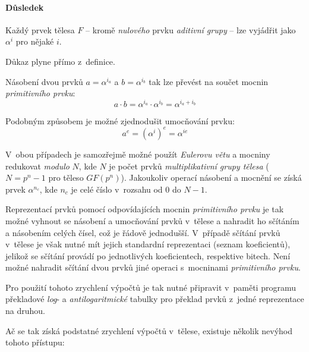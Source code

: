 \documentclass[thesis=M,czech,hidelinks]{FITthesis}[2012/06/26]
\newcommand{\0}{{\textcolor[gray]{0.80}{0}}}
\begin{document}
\paragraph{Důsledek} Každý prvek tělesa $F$ -- kromě \emph{nulového} prvku
\emph{aditivní grupy} -- lze vyjádřit jako $\alpha^i$ pro nějaké $i$.

Důkaz plyne přímo z~definice.

Násobení dvou prvků $a = \alpha^{i_a}$ a $b = \alpha^{i_b}$ tak lze převést na
součet mocnin \emph{primitivního prvku}:
$$ a \cdot b = \alpha^{i_a} \cdot \alpha^{i_b} = \alpha^{i_a + i_b} $$

Podobným způsobem je možné zjednodušit umocňování prvku:
$$ a^e = \left(\alpha^i\right)^e = \alpha^{i e} $$

V~obou případech je samozřejmě možné použít \emph{Eulerovu větu} a mocniny
redukovat \emph{modulo} $N$, kde $N$ je počet prvků \emph{multiplikativní grupy
tělesa} ($N=p^n-1$ pro těleso $GF(p^n)$). Jakoukoliv operací násobení a mocnění
se získá prvek $\alpha^{n_c}$, kde $n_c$ je celé číslo v~rozsahu od $0$ do
$N-1$.

Reprezentací prvků pomocí odpovídajících mocnin \emph{primitivního prvku} je tak
možné vyhnout se násobení a umocňování prvků v~tělese a nahradit ho sčítáním a
násobením celých čísel, což je řádově jednodušší. V~případě sčítání prvků
v~tělese je však nutné mít jejich standardní reprezentaci (seznam koeficientů),
jelikož se sčítání provádí po jednotlivých koeficientech, respektive bitech.
Není možné nahradit sčítání dvou prvků jiné operaci s~mocninami
\emph{primitivního prvku}.

Pro použití tohoto zrychlení výpočtů je tak nutné připravit v~paměti programu
překladové \emph{log}- a \emph{antilogaritmické} tabulky pro překlad prvků
z~jedné reprezentace na druhou.

\clearpage

Ač se tak získá podstatné zrychlení výpočtů v~tělese, existuje několik nevýhod
tohoto přístupu:
\end{document}
